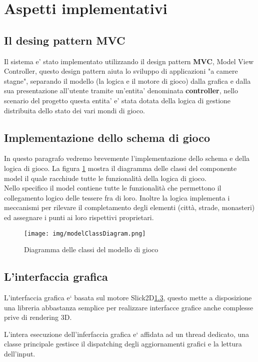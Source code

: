 \section{Aspetti implementativi}



\subsection{Il desing pattern MVC}
Il sistema e' stato implementato utilizzando il design pattern \textbf{MVC},
Model View Controller, questo design pattern aiuta lo sviluppo di applicazioni
"a camere stagne", separando il modello (la logica e il motore di gioco) dalla
grafica e dalla sua presentazione all'utente tramite un'entita' denominata
\textbf{controller}, nello scenario del progetto questa entita' e' stata
dotata della logica di gestione distribuita dello stato dei vari mondi di gioco.

\subsection{Implementazione dello schema di gioco}


In questo paragrafo vedremo brevemente l'implementazione dello schema e
della logica di gioco.
La figura \ref{img:model} mostra il diagramma delle classi del
componente model il quale racchiude tutte le funzionalità della logica
di gioco.\\
Nello specifico il model contiene tutte le funzionalità che permettono
il collegamento logico delle tessere fra di loro. 
Inoltre la logica implementa i meccanismi per rilevare il completamento degli elementi
(città, strade, monasteri) ed assegnare i punti ai loro rispettivi
proprietari.
\begin{figure}
\texttt{[image: img/modelClassDiagram.png]}
\caption{Diagramma delle classi del modello di gioco}
\label{img:model}
\end{figure}

\subsection{L'interfaccia grafica}
L'interfaccia grafica e` basata sul motore Slick2D\ref{}, %
questo mette a disposizione una libreria abbastanza semplice per realizzare interfacce grafice
anche complesse prive di rendering 3D.

L'intera esecuzione dell'inferfaccia grafica e` affidata ad un thread dedicato, una
classe principale gestisce il dispatching degli aggiornamenti grafici e la lettura
dell'input.

